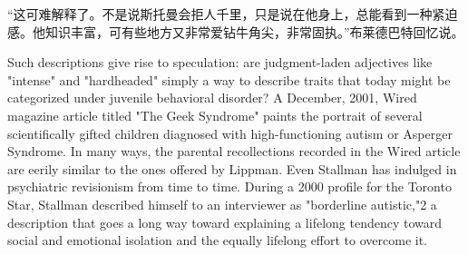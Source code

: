 \ifdefined\chs
``这可难解释了。不是说斯托曼会拒人千里，只是说在他身上，总能看到一种紧迫感。他知识丰富，可有些地方又非常爱钻牛角尖，非常固执。''布莱德巴特回忆说。
\fi

\ifdefined\eng
Such descriptions give rise to speculation: are judgment-laden adjectives like "intense" and "hardheaded" simply a way to describe traits that today might be categorized under juvenile behavioral disorder? A December, 2001, Wired magazine article titled "The Geek Syndrome" paints the portrait of several scientifically gifted children diagnosed with high-functioning autism or Asperger Syndrome. In many ways, the parental recollections recorded in the Wired article are eerily similar to the ones offered by Lippman. Even Stallman has indulged in psychiatric revisionism from time to time. During a 2000 profile for the Toronto Star, Stallman described himself to an interviewer as "borderline autistic,"2 a description that goes a long way toward explaining a lifelong tendency toward social and emotional isolation and the equally lifelong effort to overcome it.

\fi

\ifdefined\chs

